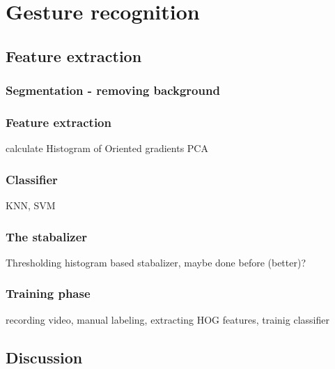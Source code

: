 
\chapter{Gesture recognition}
\label{ch:gestures}

\section{Feature extraction}
\subsection*{Segmentation - removing background}

\subsection*{Feature extraction}
calculate Histogram of Oriented gradients\cite{watanabe2009}
PCA

\subsection*{Classifier}
KNN,  SVM

\subsection*{The stabalizer}
Thresholding histogram based stabalizer, maybe done before (better)?

\subsection*{Training phase}
recording video, manual labeling, extracting HOG features, trainig classifier

\section{Discussion}